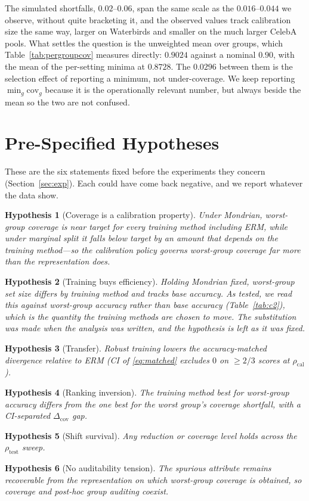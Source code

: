 \documentclass[pdflatex,sn-basic]{sn-jnl}%
\theoremstyle{thmstyleone}%
\newtheorem{hypothesis}{Hypothesis}%
\newcommand{\cov}{\mathrm{cov}}
\newcommand{\covgap}{\Delta_{\cov}}
\newcommand{\rhocal}{\rho_{\mathrm{cal}}}
\newcommand{\rhotest}{\rho_{\mathrm{test}}}
\begin{document}
\begin{appendices}
The simulated shortfalls, $0.02$--$0.06$, span the same scale as the $0.016$--$0.044$ we observe,
without quite bracketing it, and the observed values track calibration size the same way, larger on
Waterbirds and smaller on the much larger CelebA pools. What settles the question is the unweighted mean over
groups, which Table~\ref{tab:pergroupcov} measures directly: $0.9024$ against a nominal $0.90$,
with the mean of the per-setting minima at $0.8728$. The $0.0296$ between them is the selection
effect of reporting a minimum, not under-coverage. We keep reporting $\min_g\cov_g$ because it is
the operationally relevant number, but always beside the mean so the two are not confused.

\section{Pre-Specified Hypotheses}
\label{app:hyps}

These are the six statements fixed before the experiments they concern
(Section~\ref{sec:exp}). Each could have come back negative, and we report whatever the data show.

\begin{hypothesis}[Coverage is a calibration property]\label{hyp:c1}
Under Mondrian, worst-group coverage is near target for every training method
including ERM, while under marginal split it falls below target by an amount that
depends on the training method---so the calibration policy governs worst-group
coverage far more than the representation does.
\end{hypothesis}
\begin{hypothesis}[Training buys efficiency]\label{hyp:c2}
Holding Mondrian fixed, worst-group set size differs by training method and tracks
base accuracy. \emph{As tested}, we read this against \emph{worst-group} accuracy rather than base
accuracy (Table~\ref{tab:c2}), which is the quantity the training methods are chosen to move. The
substitution was made when the analysis was written, and the hypothesis is left as it was fixed.
\end{hypothesis}
\begin{hypothesis}[Transfer]\label{hyp:h1}
Robust training lowers the accuracy-matched divergence relative to ERM (CI of
\eqref{eq:matched} excludes $0$ on $\ge 2/3$ scores at $\rhocal$).
\end{hypothesis}
\begin{hypothesis}[Ranking inversion]\label{hyp:h2}
The training method best for worst-group accuracy differs from the one best for
the worst group's coverage shortfall, with a CI-separated $\covgap$ gap.
\end{hypothesis}
\begin{hypothesis}[Shift survival]\label{hyp:h3}
Any reduction or coverage level holds across the $\rhotest$ sweep.
\end{hypothesis}
\begin{hypothesis}[No auditability tension]\label{hyp:audit}
The spurious attribute remains recoverable from the representation on which
worst-group coverage is obtained, so coverage and post-hoc group auditing coexist.
\end{hypothesis}


\end{appendices}
\end{document}
